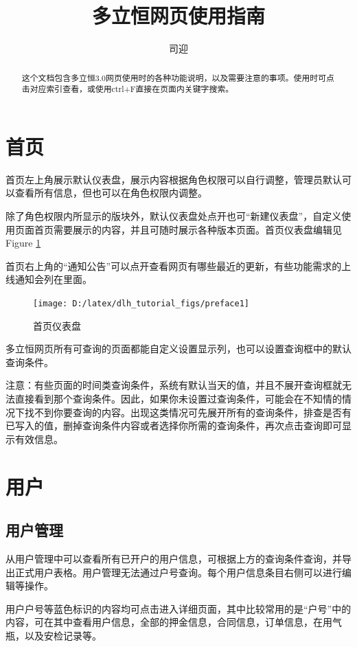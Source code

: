 \documentclass[UTF8]{ctexart}
\title{多立恒网页使用指南}
\author{司迎}
\begin{document}
\maketitle
\tableofcontents
\begin{abstract}
这个文档包含多立恒3.0网页使用时的各种功能说明，以及需要注意的事项。使用时可点击对应索引查看，或使用ctrl+F直接在页面内关键字搜索。
\end{abstract}

\section{首页}

首页左上角展示默认仪表盘，展示内容根据角色权限可以自行调整，管理员默认可以查看所有信息，但也可以在角色权限内调整。

除了角色权限内所显示的版块外，默认仪表盘处点开也可“新建仪表盘”，自定义使用页面首页需要展示的内容，并且可随时展示各种版本页面。首页仪表盘编辑见Figure \ref{fig:preface1}

首页右上角的“通知公告”可以点开查看网页有哪些最近的更新，有些功能需求的上线通知会列在里面。
\begin{figure}[h]
	\centering
	\texttt{[image: D:/latex/dlh\_tutorial\_figs/preface1]}
	\caption{首页仪表盘}
	\label{fig:preface1}
\end{figure}

多立恒网页所有可查询的页面都能自定义设置显示列，也可以设置查询框中的默认查询条件。

注意：有些页面的时间类查询条件，系统有默认当天的值，并且不展开查询框就无法直接看到那个查询条件。因此，如果你未设置过查询条件，可能会在不知情的情况下找不到你要查询的内容。出现这类情况可先展开所有的查询条件，排查是否有已写入的值，删掉查询条件内容或者选择你所需的查询条件，再次点击查询即可显示有效信息。

\section{用户}

\subsection{用户管理}
从用户管理中可以查看所有已开户的用户信息，可根据上方的查询条件查询，并导出正式用户表格。用户管理无法通过户号查询。每个用户信息条目右侧可以进行编辑等操作。

用户户号等蓝色标识的内容均可点击进入详细页面，其中比较常用的是“户号”中的内容，可在其中查看用户信息，全部的押金信息，合同信息，订单信息，在用气瓶，以及安检记录等。
\end{document}
